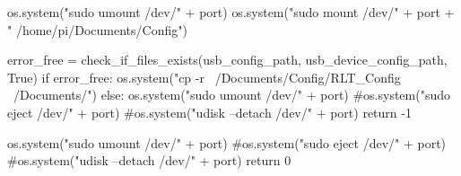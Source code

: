 \begin{pythoncode}
	os.system("sudo umount /dev/" + port)
	os.system("sudo mount /dev/" + port + " /home/pi/Documents/Config")
	
	error_free = check_if_files_exists(usb_config_path, usb_device_config_path, True)
	if error_free:
		os.system("cp -r ~/Documents/Config/RLT_Config ~/Documents/")
	else:
		os.system("sudo umount /dev/" + port)
		#os.system("sudo eject /dev/" + port) 
		#os.system("udisk --detach /dev/" + port)
		return -1
		
	os.system("sudo umount /dev/" + port)
	#os.system("sudo eject /dev/" + port) 
	#os.system("udisk --detach /dev/" + port)
	return 0
\end{pythoncode}